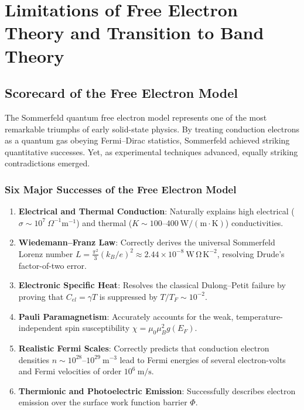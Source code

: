 \documentclass[11pt,a4paper]{article}
\begin{document}
\clearpage


\section{Limitations of Free Electron Theory and Transition to Band Theory}
\label{sec:limitations_and_bands}

\subsection{Scorecard of the Free Electron Model}
The Sommerfeld quantum free electron model represents one of the most remarkable triumphs of early solid-state physics. By treating conduction electrons as a quantum gas obeying Fermi--Dirac statistics, Sommerfeld achieved striking quantitative successes. Yet, as experimental techniques advanced, equally striking contradictions emerged.

\subsubsection{Six Major Successes of the Free Electron Model}
\begin{enumerate}[leftmargin=*]
    \item \textbf{Electrical and Thermal Conduction}: Naturally explains high electrical ($\sigma \sim 10^7\ \Omega^{-1}\mathrm{m}^{-1}$) and thermal ($K \sim 100\text{--}400\ \mathrm{W/(m\cdot K)}$) conductivities.
    \item \textbf{Wiedemann--Franz Law}: Correctly derives the universal Sommerfeld Lorenz number $L = \frac{\pi^2}{3}(k_B/e)^2 \approx 2.44 \times 10^{-8}\ \mathrm{W\,\Omega\,K^{-2}}$, resolving Drude's factor-of-two error.
    \item \textbf{Electronic Specific Heat}: Resolves the classical Dulong--Petit failure by proving that $C_{el} = \gamma T$ is suppressed by $T/T_F \sim 10^{-2}$.
    \item \textbf{Pauli Paramagnetism}: Accurately accounts for the weak, temperature-independent spin susceptibility $\chi = \mu_0 \mu_B^2 g(E_F)$.
    \item \textbf{Realistic Fermi Scales}: Correctly predicts that conduction electron densities $n \sim 10^{28}\text{--}10^{29}\ \mathrm{m}^{-3}$ lead to Fermi energies of several electron-volts and Fermi velocities of order $10^6\ \mathrm{m/s}$.
    \item \textbf{Thermionic and Photoelectric Emission}: Successfully describes electron emission over the surface work function barrier $\Phi$.
\end{enumerate}
\end{document}
